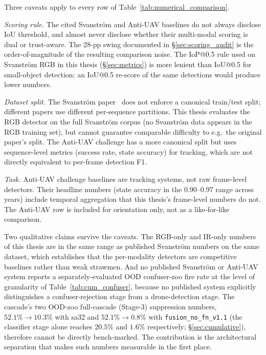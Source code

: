 \documentclass[12pt,a4paper,oneside,openright]{book}
\begin{document}
Three caveats apply to every row of Table~\ref{tab:numerical_comparison}.

\emph{Scoring rule.} The cited Svanstr\"om and Anti-UAV baselines do not always disclose IoU threshold, and almost never disclose whether their multi-modal scoring is dual or trust-aware. The 28-pp swing documented in \S\ref{sec:scoring_audit} is the order-of-magnitude of the resulting comparison noise. The IoP@0.5 rule used on Svanstr\"om RGB in this thesis (\S\ref{sec:metrics}) is more lenient than IoU@0.5 for small-object detection; an IoU@0.5 re-score of the same detections would produce lower numbers.

\emph{Dataset split.} The Svanstr\"om paper~\cite{svanstrom2021real} does not enforce a canonical train/test split; different papers use different per-sequence partitions. This thesis evaluates the RGB detector on the full Svanstr\"om corpus (no Svanstr\"om data appears in the RGB training set), but cannot guarantee comparable difficulty to e.g.\ the original paper's split. The Anti-UAV challenge has a more canonical split but uses sequence-level metrics (success rate, state accuracy) for tracking, which are not directly equivalent to per-frame detection F1.

\emph{Task.} Anti-UAV challenge baselines are tracking systems, not raw frame-level detectors. Their headline numbers (state accuracy in the 0.90--0.97 range across years) include temporal aggregation that this thesis's frame-level numbers do not. The Anti-UAV row is included for orientation only, not as a like-for-like comparison.

Two qualitative claims survive the caveats. The RGB-only and IR-only numbers of this thesis are in the same range as published Svanstr\"om numbers on the same dataset, which establishes that the per-modality detectors are competitive baselines rather than weak strawmen. And no published Svanstr\"om or Anti-UAV system reports a separately-evaluated OOD confuser-zoo fire rate at the level of granularity of Table~\ref{tab:cum_confuser}, because no published system explicitly distinguishes a confuser-rejection stage from a drone-detection stage. The cascade's two OOD-zoo full-cascade (Stage-3) suppression numbers, $52.1\% \to 10.3\%$ with sa32 and $52.1\% \to 0.8\%$ with \texttt{fusion\_no\_fn\_v1.1} (the classifier stage alone reaches $20.5\%$ and $1.6\%$ respectively; \S\ref{sec:cumulative}), therefore cannot be directly bench-marked. The contribution is the architectural separation that makes such numbers measurable in the first place.
\end{document}
